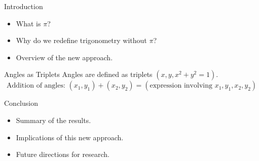 \documentclass{beamer}
\begin{document}
\begin{frame}{Introduction}
    \begin{itemize}
        \item What is $\pi$?
        \item Why do we redefine trigonometry without $\pi$?
        \item Overview of the new approach.
    \end{itemize}
\end{frame}

\begin{frame}{Angles as Triplets}
    Angles are defined as triplets $(x, y, x^2 + y^2 = 1)$.
    \begin{equation}
        \text{Addition of angles: } (x_1, y_1) + (x_2, y_2) = (\text{expression involving } x_1, y_1, x_2, y_2)
    \end{equation}
\end{frame}

\begin{frame}{Conclusion}
    \begin{itemize}
        \item Summary of the results.
        \item Implications of this new approach.
        \item Future directions for research.
    \end{itemize}
\end{frame}
\end{document}
